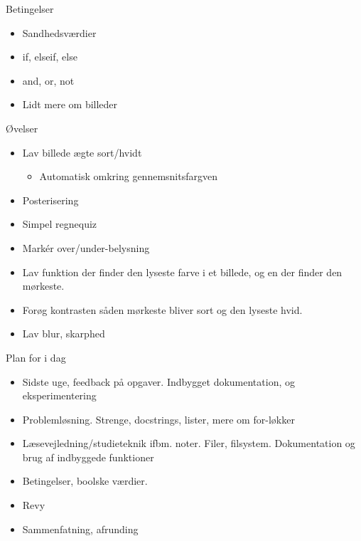 \documentclass[a4paper,landscape]{slides}
\begin{document}
\begin{slide}
	\begin{center} {\large 
            Betingelser
	} \end{center}
	\begin{itemize} \addtolength{\itemsep}{-\baselineskip}
		\item Sandhedsværdier
		\item if, elseif, else
                \item and, or, not
                \item Lidt mere om billeder
	\end{itemize}
\end{slide}

\begin{slide}
	\begin{center} {\large 
            Øvelser
	} \end{center}
	\begin{itemize} \addtolength{\itemsep}{-\baselineskip}
    		\item Lav billede ægte sort/hvidt
	\begin{itemize} \addtolength{\itemsep}{-\baselineskip}
                    \item Automatisk omkring gennemsnitsfargven
	\end{itemize}
                \item Posterisering
    		\item Simpel regnequiz
    		\item Markér over/under-belysning
    		\item Lav funktion der finder den lyseste farve i et billede, og en der finder den mørkeste.
    		\item Forøg kontrasten såden mørkeste bliver sort og den lyseste hvid.
    		\item Lav blur, skarphed
	\end{itemize}
\end{slide}

\begin{slide}
	\begin{center} {\large 
            Plan for i dag
	} \end{center}
	\begin{itemize} \addtolength{\itemsep}{-\baselineskip}
    		\item Sidste uge, feedback på opgaver. Indbygget dokumentation, og eksperimentering
    		\item Problemløsning. Strenge, docstrings, lister, mere om for-løkker
    		\item Læsevejledning/studieteknik ifbm. noter. Filer, filsystem. Dokumentation og brug af indbyggede funktioner
    		\item Betingelser, boolske værdier.
    		\item Revy
    		\item Sammenfatning, afrunding
	\end{itemize}
\end{slide}
\end{document}
